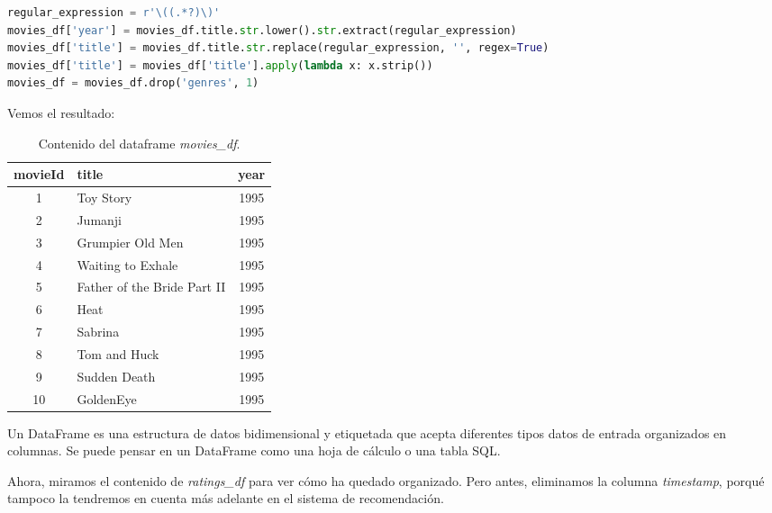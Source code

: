 \documentclass{uimppracticas}
\begin{document}
\newpage

\begin{lstlisting}[language=python, basicstyle=\footnotesize, belowskip=-0.5 \baselineskip]
regular_expression = r'\((.*?)\)'
movies_df['year'] = movies_df.title.str.lower().str.extract(regular_expression)
movies_df['title'] = movies_df.title.str.replace(regular_expression, '', regex=True)
movies_df['title'] = movies_df['title'].apply(lambda x: x.strip())
movies_df = movies_df.drop('genres', 1)
\end{lstlisting}

Vemos el resultado:

\begin{table}[H]
	\centering
	\begin{tabular}{clc}
		\toprule
		movieId &                  title &  year \\
		\midrule
		1 &                    Toy Story &  1995 \\
		2 &                      Jumanji &  1995 \\
		3 &             Grumpier Old Men &  1995 \\
		4 &            Waiting to Exhale &  1995 \\
		5 &  Father of the Bride Part II &  1995 \\
		6 &                         Heat &  1995 \\
		7 &                      Sabrina &  1995 \\
		8 &                 Tom and Huck &  1995 \\
		9 &                 Sudden Death &  1995 \\
		10 &                    GoldenEye &  1995 \\
		\bottomrule
	\end{tabular}
	\caption{Contenido del dataframe \textit{movies\_df}.}
	\label{movies_df_final}
\end{table}

\begin{definition}\label{dataframe}
	Un DataFrame es una estructura de datos bidimensional y etiquetada que acepta diferentes tipos datos de entrada organizados en columnas. Se puede pensar en un DataFrame como una hoja de cálculo o una tabla SQL.
\end{definition}

Ahora, miramos el contenido de \textit{ratings\_df} para ver cómo ha quedado organizado. Pero antes, eliminamos la columna \textit{timestamp}, porqué tampoco la tendremos en cuenta más adelante en el sistema de recomendación.
\end{document}

